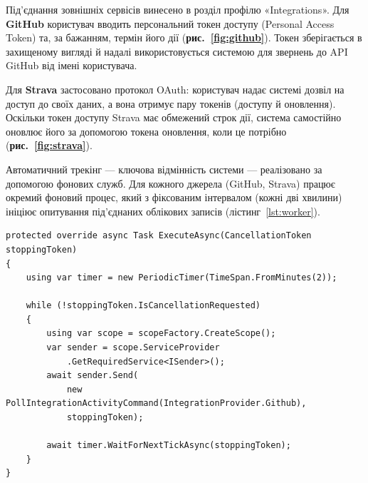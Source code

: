 

Під'єднання зовнішніх сервісів винесено в розділ профілю «Integrations». Для \textbf{GitHub} користувач вводить персональний токен доступу (Personal Access Token) та, за бажанням, термін його дії (\textbf{рис.~\ref{fig:github}}). Токен зберігається в захищеному вигляді й надалі використовується системою для звернень до API GitHub від імені користувача.


Для \textbf{Strava} застосовано протокол OAuth: користувач надає системі дозвіл на доступ до своїх даних, а вона отримує пару токенів (доступу й оновлення). Оскільки токен доступу Strava має обмежений строк дії, система самостійно оновлює його за допомогою токена оновлення, коли це потрібно (\textbf{рис.~\ref{fig:strava}}).



Автоматичний трекінг — ключова відмінність системи — реалізовано за допомогою фонових служб. Для кожного джерела (GitHub, Strava) працює окремий фоновий процес, який з фіксованим інтервалом (кожні дві хвилини) ініціює опитування під'єднаних облікових записів (лістинг~\ref{lst:worker}).

\begin{lstlisting}[style=nocodeframe, caption={Фоновий процес періодичного опитування GitHub}, label={lst:worker}]
protected override async Task ExecuteAsync(CancellationToken stoppingToken)
{
    using var timer = new PeriodicTimer(TimeSpan.FromMinutes(2));

    while (!stoppingToken.IsCancellationRequested)
    {
        using var scope = scopeFactory.CreateScope();
        var sender = scope.ServiceProvider
            .GetRequiredService<ISender>();
        await sender.Send(
            new PollIntegrationActivityCommand(IntegrationProvider.Github),
            stoppingToken);

        await timer.WaitForNextTickAsync(stoppingToken);
    }
}
\end{lstlisting}

